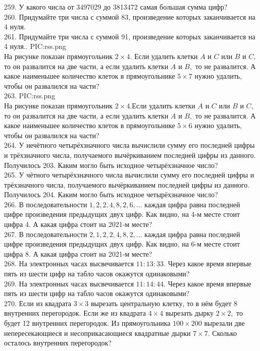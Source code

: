 259. У какого числа от 3497029 до 3813472 самая большая сумма цифр?\\
260. Придумайте три числа с суммой 83, произведение которых заканчивается на 4 нуля.\\
261. Придумайте три числа с суммой 91, произведение которых заканчивается на 4 нуля.\newpage{}. {{PIC:rss.png}}\\
На рисунке показан прямоугольник $2\times4.$ Если удалить клетки $A$ и $C$ или $B$ и $C,$ то он развалится на две части, а если удалить клетки $A$ и $B,$ то не развалится. А какое наименьшее количество клеток в прямоугольнике $5\times7$ нужно удалить, чтобы он развалился на части?\\
263. {{PIC:rss.png}}\\
На рисунке показан прямоугольник $2\times4.$Если удалить клетки $A$ и $C$ или $B$ и $C,$ то он развалится на две части, а если удалить клетки $A$ и $B,$ то не развалится. А какое наименьшее количество клеток в прямоугольнике $5\times6$ нужно удалить, чтобы он развалился на части?\\
264. У нечётного четырёхзначного числа вычислили сумму его последней цифры и трёхзначного числа, получаемого вычёркиванием последней цифры из данного. Получилось 203. Каким могло быть исходное четырёхзначное число?\\
265. У чётного четырёхзначного числа вычислили сумму его последней цифры и трёхзначного числа, получаемого вычёркиванием последней цифры из данного. Получилось 204. Каким могло быть исходное четырёхзначное число?\\
266. В последовательности $1, 2, 2, 4, 8, 2, 6, \ldots$ каждая цифра равна последней цифре произведения предыдущих двух цифр. Как видно, на 4-м месте стоит цифра 4. А какая цифра стоит на 2021-м месте?\\
267. В последовательности $2, 1, 2, 2, 4, 8, 2, \ldots$ каждая цифра равна последней цифре произведения предыдущих двух цифр. Как видно, на 6-м месте стоит цифра 8. А какая цифра стоит на 2021-м месте?\\
268. На электронных часах высвечивается $11:13:33.$ Через какое время впервые пять из шести цифр на табло часов окажутся одинаковыми?\\
269. На электронных часах высвечивается $11:14:44.$ Через какое время впервые пять из шести цифр на табло часов окажутся одинаковыми?\\
270. Если из квадрата $3\times3$ вырезать центральную клетку, то в нём будет 8 внутренних перегородок. Если же из квадрата $4\times4$ вырезать дырку $2\times2,$ то будет 12 внутренних перегородок. Из прямоугольника $100\times200$ вырезали две непересекающиеся и несоприкасающиеся квадратные дырки $7\times7.$ Сколько осталось внутренних перегородок?\\
